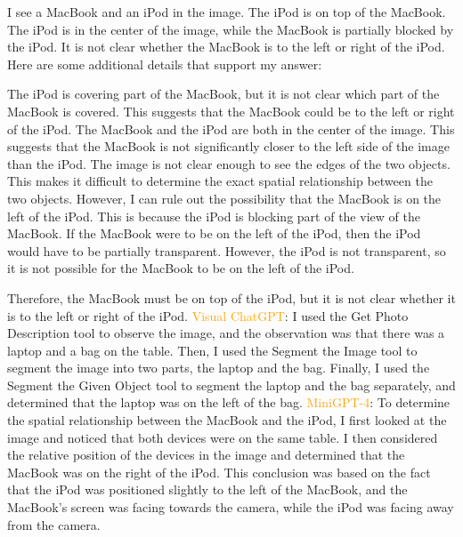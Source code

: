\begin{enumerate}
    I see a MacBook and an iPod in the image.
    The iPod is on top of the MacBook.
    The iPod is in the center of the image, while the MacBook is partially blocked by the iPod.
    It is not clear whether the MacBook is to the left or right of the iPod.
    Here are some additional details that support my answer:
    
    The iPod is covering part of the MacBook, but it is not clear which part of the MacBook is covered. This suggests that the MacBook could be to the left or right of the iPod.
    The MacBook and the iPod are both in the center of the image. This suggests that the MacBook is not significantly closer to the left side of the image than the iPod.
    The image is not clear enough to see the edges of the two objects. This makes it difficult to determine the exact spatial relationship between the two objects.
    However, I can rule out the possibility that the MacBook is on the left of the iPod. This is because the iPod is blocking part of the view of the MacBook. If the MacBook were to be on the left of the iPod, then the iPod would have to be partially transparent. However, the iPod is not transparent, so it is not possible for the MacBook to be on the left of the iPod.
    
    Therefore, the MacBook must be on top of the iPod, but it is not clear whether it is to the left or right of the iPod.
    \subitem \textcolor{orange}{Visual ChatGPT}: I used the Get Photo Description tool to observe the image, and the observation was that there was a laptop and a bag on the table. Then, I used the Segment the Image tool to segment the image into two parts, the laptop and the bag. Finally, I used the Segment the Given Object tool to segment the laptop and the bag separately, and determined that the laptop was on the left of the bag.
    \subitem \textcolor{orange}{MiniGPT-4}: To determine the spatial relationship between the MacBook and the iPod, I first looked at the image and noticed that both devices were on the same table. I then considered the relative position of the devices in the image and determined that the MacBook was on the right of the iPod. This conclusion was based on the fact that the iPod was positioned slightly to the left of the MacBook, and the MacBook’s screen was facing towards the camera, while the iPod was facing away from the camera.
\end{enumerate}
